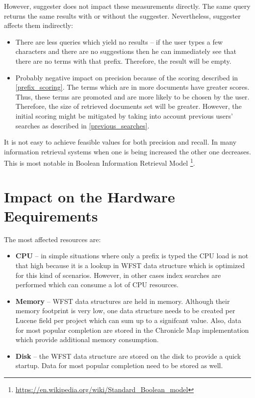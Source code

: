 However, suggester does not impact these measurements directly. The same query returns the same results with or without
the suggester. Nevertheless, suggester affects them indirectly:
\begin{itemize}
    \item There are less queries which yield no results – if the user types a few characters and there are no suggestions then he
    can immediately see that there are no terms with that prefix. Therefore, the result will be empty.
    \item Probably negative impact on precision because of the scoring described in \ref{prefix_scoring}. The terms which
    are in more documents have greater scores. Thus, these terms are promoted and are more likely to be chosen by the user.
    Therefore, the size of retrieved documents set will be greater. However, the initial scoring might be mitigated
    by taking into account previous users' searches as described in \ref{previous_searches}.
\end{itemize}

It is not easy to achieve feasible values for both precision and recall. In many information retrieval systems when one is
being increased the other one decreases. This is most notable in Boolean Information Retrieval Model
\footnote{\url{https://en.wikipedia.org/wiki/Standard\_Boolean\_model}}.

\section{Impact on the Hardware Eequirements}
\label{hw_req_impact}
The most affected resources are:
\begin{itemize}
    \item \textbf{CPU} – in simple situations where only a prefix is typed the CPU load is not that high because it
    is a lookup in WFST data structure which is optimized for this kind of scenarios. However, in other cases
    index searches are performed which can consume a lot of CPU resources.
    \item \textbf{Memory} – WFST data structures are held in memory. Although their memory footprint is very low,
    one data structure needs to be created per Lucene field per project which can sum up to a signifcant value.
    Also, data for most popular completion are stored in the Chronicle Map implementation which provide additional
    memory consumption.
    \item \textbf{Disk} – the WFST data structure are stored on the disk to provide a quick startup.
    Data for most popular completion need to be stored as well.
\end{itemize}

